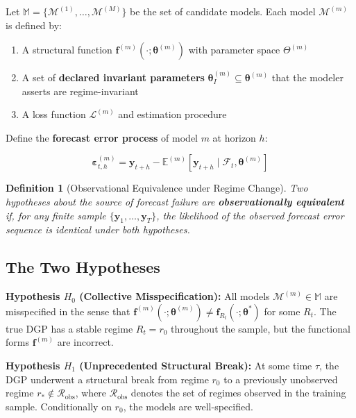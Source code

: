 \documentclass[12pt,a4paper]{article}
\newtheorem{definition}[theorem]{Definition}
\begin{document}
Let $\mathbb{M} = \{\mathcal{M}^{(1)}, \ldots, \mathcal{M}^{(M)}\}$ be
the set of candidate models.  Each model $\mathcal{M}^{(m)}$ is defined by:

\begin{enumerate}[label=(\roman*), leftmargin=*]
    \item A structural function $\mathbf{f}^{(m)}(\cdot;
      \boldsymbol{\theta}^{(m)})$ with parameter space $\Theta^{(m)}$
    \item A set of \textbf{declared invariant parameters}
      $\boldsymbol{\theta}^{(m)}_I \subseteq \boldsymbol{\theta}^{(m)}$
      that the modeler asserts are regime-invariant
    \item A loss function $\mathcal{L}^{(m)}$ and estimation procedure
\end{enumerate}

Define the \textbf{forecast error process} of model $m$ at horizon $h$:

\begin{equation}
    \boldsymbol{\varepsilon}_{t,h}^{(m)} = \mathbf{y}_{t+h} -
    \mathbb{E}^{(m)}[\mathbf{y}_{t+h} \mid \mathcal{F}_t,
    \boldsymbol{\theta}^{(m)}] \label{eq:fe_process}
\end{equation}

\begin{definition}[Observational Equivalence under Regime Change]
\label{def:obs_equiv}
Two hypotheses about the source of forecast failure are
\textbf{observationally equivalent} if, for any finite sample
$\{\mathbf{y}_1, \ldots, \mathbf{y}_T\}$, the likelihood of the
observed forecast error sequence is identical under both hypotheses.
\end{definition}

\subsection{The Two Hypotheses}

\textbf{Hypothesis $H_0$ (Collective Misspecification):} All models
$\mathcal{M}^{(m)} \in \mathbb{M}$ are misspecified in the sense
that $\mathbf{f}^{(m)}(\cdot; \boldsymbol{\theta}^{(m)}) \neq
\mathbf{f}_{R_t}(\cdot; \boldsymbol{\theta}^*)$ for some $R_t$.  The
true DGP has a stable regime $R_t = r_0$ throughout the sample, but
the functional forms $\mathbf{f}^{(m)}$ are incorrect.

\textbf{Hypothesis $H_1$ (Unprecedented Structural Break):} At some
time $\tau$, the DGP underwent a structural break from regime $r_0$
to a previously unobserved regime $r_* \notin \mathcal{R}_{\text{obs}}$,
where $\mathcal{R}_{\text{obs}}$ denotes the set of regimes observed
in the training sample.  Conditionally on $r_0$, the models are
well-specified.
\end{document}
